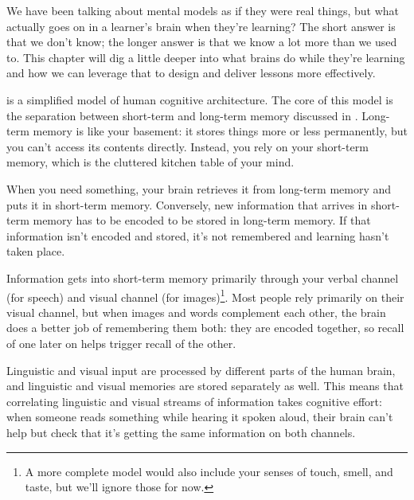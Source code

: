 
We have been talking about mental models as if they were real things,
but what actually goes on in a learner's brain when they're learning?
The short answer is that we don't know;
the longer answer is that we know a lot more than we used to.
This chapter will dig a little deeper into what brains do while they're learning
and how we can leverage that to design and deliver lessons more effectively.



 is a simplified model of human cognitive architecture.
The core of this model is
the separation between short-term and long-term memory discussed in .
Long-term memory is like your basement:
it stores things more or less permanently,
but you can't access its contents directly.
Instead,
you rely on your short-term memory,
which is the cluttered kitchen table of your mind.

When you need something,
your brain retrieves it from long-term memory and puts it in short-term memory.
Conversely,
new information that arrives in short-term memory
has to be encoded to be stored in long-term memory.
If that information isn't encoded and stored,
it's not remembered and learning hasn't taken place.

Information gets into short-term memory primarily through your verbal channel (for speech)
and visual channel (for images)\footnote{A more complete model
would also include your senses of touch, smell, and taste,
but we'll ignore those for now.}.
Most people rely primarily on their visual channel,
but when images and words complement each other,
the brain does a better job of remembering them both:
they are encoded together,
so recall of one later on helps trigger recall of the other.

Linguistic and visual input are processed by different parts of the human brain,
and linguistic and visual memories are stored separately as well.
This means that correlating linguistic and visual streams of information takes cognitive effort:
when someone reads something while hearing it spoken aloud,
their brain can't help but check that it's getting the same information on both channels.

